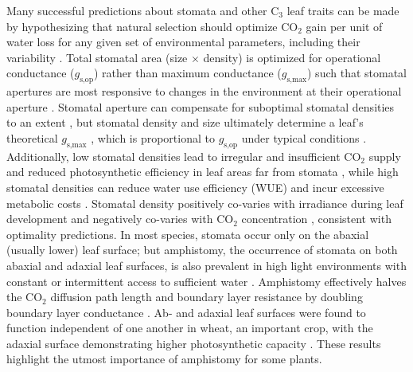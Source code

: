 \documentclass[webpdf,large,modern,unnumsec,namedate]{oup-authoring-template}
\begin{document}
Many successful predictions about stomata and other C\(_3\) leaf traits
can be made by hypothesizing that natural selection should optimize
CO\(_2\) gain per unit of water loss for any given set of environmental
parameters, including their variability
\citep{cowan_stomatal_1977, buckley_optimal_2017, sperry_predicting_2017}.
Total stomatal area (size \(\times\) density) is optimized for
operational conductance (\(g_\text{s,op}\)) rather than maximum
conductance (\(g_\text{s,max}\)) such that stomatal apertures are most
responsive to changes in the environment at their operational aperture
\citep{franks_physiological_2012, liu_scaling_2021}. Stomatal aperture
can compensate for suboptimal stomatal densities to an extent
\citep{bussis_stomatal_2006}, but stomatal density and size ultimately
determine a leaf's theoretical \(g_\text{s,max}\)
\citep{sack_developmental_2016}, which is proportional to
\(g_\text{s,op}\) under typical conditions
\citep{mcelwain_using_2016, murray_consistent_2020}. Additionally, low
stomatal densities lead to irregular and insufficient CO\(_2\) supply
and reduced photosynthetic efficiency in leaf areas far from stomata
\citep{pieruschka_lateral_2006, morison_lateral_2005}, while high
stomatal densities can reduce water use efficiency (WUE)
\citep{bussis_stomatal_2006} and incur excessive metabolic costs
\citep{de_boer_optimal_2016, deans_optimization_2020}. Stomatal density
positively co-varies with irradiance during leaf development and
negatively co-varies with CO\(_2\) concentration
\citep{gay_influence_1975, schoch_dependence_1980, woodward_stomatal_1987, royer_stomatal_2001},
consistent with optimality predictions. In most species, stomata occur
only on the abaxial (usually lower) leaf surface; but amphistomy, the
occurrence of stomata on both abaxial and adaxial leaf surfaces, is also
prevalent in high light environments with constant or intermittent
access to sufficient water
\citep{mott_adaptive_1982, jordan_using_2014, muir_light_2018, drake_two_2019, muir_is_2019}.
Amphistomy effectively halves the CO\(_2\) diffusion path length and
boundary layer resistance by doubling boundary layer conductance \citep[
\citet{harrison_influence_2020}]{parkhurst_adaptive_1978, mott_amphistomy_1991}.
Ab- and adaxial leaf surfaces were found to function independent of one
another in wheat, an important crop, with the adaxial surface
demonstrating higher photosynthetic capacity \citep{wall_stomata_2022}.
These results highlight the utmost importance of amphistomy for some
plants.
\end{document}
